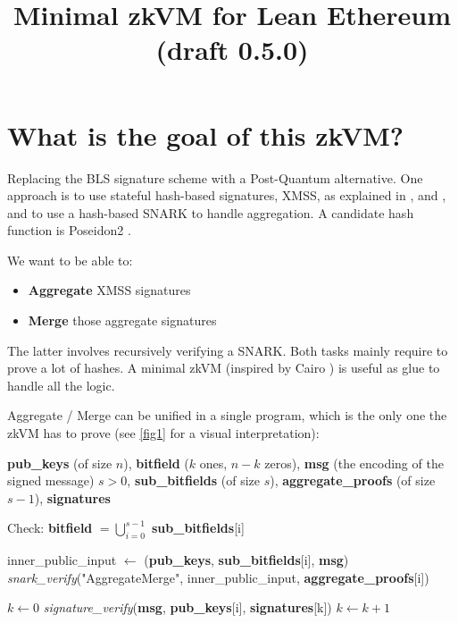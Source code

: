 \documentclass{article}
\title{Minimal zkVM for Lean Ethereum (draft 0.5.0)}
\date{}
\theoremstyle{definition}
\begin{document}
\maketitle

\section{What is the goal of this zkVM?}

Replacing the BLS signature scheme with a Post-Quantum alternative. One approach is to use stateful hash-based signatures, XMSS, as explained in \cite{ethereum_signatures}, \cite{top_hypercube} and \cite{LeanSig}, and to use a hash-based SNARK to handle aggregation.
A candidate hash function is Poseidon2 \cite{poseidon2}.

We want to be able to:

\begin{itemize}
    \item \textbf{Aggregate} XMSS signatures
    \item \textbf{Merge} those aggregate signatures
\end{itemize}

The latter involves recursively verifying a SNARK. Both tasks mainly require to prove a lot of hashes. A minimal zkVM (inspired by Cairo \cite{cairo}) is useful as glue to handle all the logic.

Aggregate / Merge can be unified in a single program, which is the only one the zkVM has to prove (see \ref{fig1} for a visual interpretation):

\begin{algorithm}
\caption{AggregateMerge}
\begin{algorithmic}[1]
\publicinput \textbf{pub\_keys} (of size $n$), \textbf{bitfield} ($k$ ones, $n-k$ zeros), \textbf{msg} (the encoding of the signed message)
\privateinput $s > 0$, \textbf{sub\_bitfields} (of size $s$), \textbf{aggregate\_proofs} (of size $s - 1$), \textbf{signatures}



\State Check: \textbf{bitfield} $= \bigcup_{i=0}^{s-1}$
\textbf{sub\_bitfields}[i]


\State {}

    \State inner\_public\_input $\gets$ (\textbf{pub\_keys}, \textbf{sub\_bitfields}[i], \textbf{msg})
    \State \textit{snark\_verify}("AggregateMerge", inner\_public\_input, \textbf{aggregate\_proofs}[i])
\EndFor

\State {}

\State $k \gets 0$
       \State \textit{signature\_verify}(\textbf{msg}, \textbf{pub\_keys}[i], \textbf{signatures}[k])
       \State $k \gets k + 1$
    \EndIf
\EndFor

\end{algorithmic}
\end{algorithm}
\end{document}

